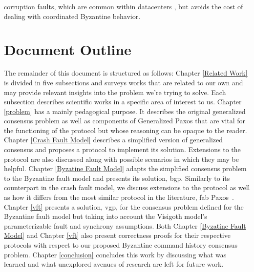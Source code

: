 corruption faults, which are common within datacenters \cite{AmazonS32}, but avoids the cost of dealing with coordinated Byzantine behavior.\par 
\fi

\section{Document Outline}
The remainder of this document is structured as follows: Chapter \ref{Related Work} is divided in five subsections and surveys works that are related to our own and may provide relevant insights into the problem we're trying to solve. Each subsection describes scientific works in a specific area of interest to us. Chapter \ref{problem} has a mainly pedagogical purpose. It describes the original generalized consensus problem as well as components of Generalized Paxos that are vital for the functioning of the protocol but whose reasoning can be opaque to the reader. Chapter \ref{Crash Fault Model} describes a simplified version of generalized consensus and proposes a protocol to implement its solution. Extensions to the protocol are also discussed along with possible scenarios in which they may be helpful. Chapter \ref{Byzatine Fault Model} adapts the simplified consensus problem to the Byzantine fault model and presents its solution, \acrlong{bgp}. Similarly to its counterpart in the crash fault model, we discuss extensions to the protocol as well as how it differs from the most similar protocol in the literature, \acrfull{fab} Paxos~\cite{Martin2006}. Chapter \ref{vft} presents a solution, \acrlong{vgp}, for the consensus problem defined for the Byzantine fault model but taking into account the Visigoth model's parameterizable fault and synchrony assumptions. Both Chapter \ref{Byzatine Fault Model} and Chapter \ref{vft} also present correctness proofs for their respective protocols with respect to our proposed Byzantine command history consensus problem. Chapter \ref{conclusion} concludes this work by discussing what was learned and what unexplored avenues of research are left for future work.
